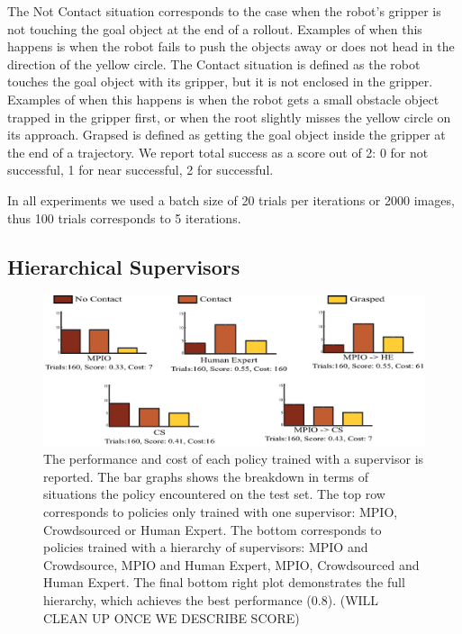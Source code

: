 \documentclass[10pt, conference]{ieeeconf}      %
\begin{document}
The Not Contact situation corresponds to the case when the robot's gripper is not touching the goal object at the end of a rollout. Examples of when this happens is when the robot fails to push the objects away or does not head in the direction of the yellow circle. The Contact situation is defined as the robot touches the goal object with its gripper, but it is not enclosed in the gripper. Examples of when this happens is when the robot gets a small obstacle object trapped in the gripper first, or when the root slightly misses the yellow circle on its approach. Grapsed is defined as getting the goal object inside the gripper at the end of a trajectory. We report total success as a score out of 2: 0 for not successful, 1 for near successful, 2 for successful. 

In all experiments we used a batch size of 20 trials per iterations or 2000 images, thus 100 trials corresponds to 5 iterations. 

\subsection{Hierarchical Supervisors}

\begin{figure}[t]
\centering
\includegraphics{f_figs/results.eps}

\caption{ \footnotesize The performance and cost of each policy trained with a supervisor is reported. The bar graphs shows the breakdown in terms of situations the policy encountered on the test set. The top row corresponds to policies only trained with one supervisor: MPIO, Crowdsourced or Human Expert. The bottom corresponds to policies trained with a hierarchy of supervisors: MPIO and Crowdsource, MPIO and Human Expert, MPIO, Crowdsourced and Human Expert. The final bottom right plot demonstrates the full hierarchy, which achieves the best performance (0.8).  (WILL CLEAN UP ONCE WE DESCRIBE SCORE)  }

\label{fig:perf_results}
\end{figure}
\end{document}
